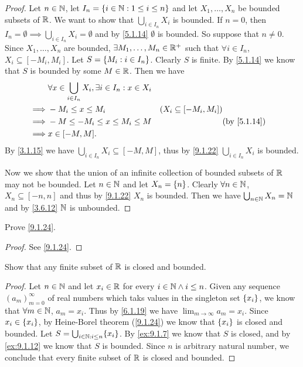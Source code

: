 \begin{proof}
	Let \(n \in \mathbb{N}\), let \(I_n = \left\lbrace i \in \mathbb{N} : 1 \leq i \leq n\right\rbrace\) and let \(X_1, \dots, X_n\) be bounded subsets of \(\mathbb{R}\).
	We want to show that \(\bigcup_{i \in I_n} X_i\) is bounded.
	If \(n = 0\), then \(I_n = \emptyset \implies \bigcup_{i \in I_n} X_i = \emptyset\) and by \cref{5.1.14} \(\emptyset\) is bounded.
	So suppose that \(n \neq 0\).
	Since \(X_1, \dots, X_n\) are bounded, \(\exists M_1, \dots, M_n \in \mathbb{R}^+\) such that \(\forall i \in I_n\), \(X_i \subseteq [-M_i, M_i]\).
	Let \(S = \left\lbrace M_i : i \in I_n\right\rbrace\).
	Clearly \(S\) is finite.
	By \cref{5.1.14} we know that \(S\) is bounded by some \(M \in \mathbb{R}\).
	Then we have
	\begin{align*}
		         & \forall x \in \bigcup_{i \in I_n} X_i, \exists i \in I_n : x \in X_i                                             \\
		\implies & -M_i \leq x \leq M_i                                                 & (X_i \subseteq [-M_i, M_i])               \\
		\implies & -M \leq -M_i \leq x \leq M_i \leq M                                  &                             & \by{5.1.14} \\
		\implies & x \in [-M, M].
	\end{align*}
	By \cref{3.1.15} we have \(\bigcup_{i \in I_n} X_i \subseteq [-M, M]\), thus by \cref{9.1.22} \(\bigcup_{i \in I_n} X_i\) is bounded.

	Now we show that the union of an infinite collection of bounded subsets of \(\mathbb{R}\) may not be bounded.
	Let \(n \in \mathbb{N}\) and let \(X_n = \left\lbrace n\right\rbrace\).
	Clearly \(\forall n \in \mathbb{N}\), \(X_n \subseteq [-n, n]\) and thus by \cref{9.1.22} \(X_n\) is bounded.
	Then we have \(\bigcup_{n \in \mathbb{N}} X_n = \mathbb{N}\) and by \cref{3.6.12} \(\mathbb{N}\) is unbounded.
\end{proof}

\begin{ex}\label{ex:9.1.13}
	Prove \cref{9.1.24}.
\end{ex}

\begin{proof}
	See \cref{9.1.24}.
\end{proof}

\begin{ex}\label{ex:9.1.14}
	Show that any finite subset of \(\mathbb{R}\) is closed and bounded.
\end{ex}

\begin{proof}
	Let \(n \in \mathbb{N}\) and let \(x_i \in \mathbb{R}\) for every \(i \in \mathbb{N} \land i \leq n\).
	Given any sequence \((a_m)_{m = 0}^\infty\) of real numbers which taks values in the singleton set \(\left\lbrace x_i\right\rbrace\), we know that \(\forall m \in \mathbb{N}\), \(a_m = x_i\).
	Thus by \cref{6.1.19} we have \(\lim_{m \to \infty} a_m = x_i\).
	Since \(x_i \in \left\lbrace x_i\right\rbrace\), by Heine-Borel theorem (\cref{9.1.24}) we know that \(\left\lbrace x_i\right\rbrace\) is closed and bounded.
	Let \(S = \bigcup_{i \in \N : i \leq n} \set{x_i}\).
	By \cref{ex:9.1.7} we know that \(S\) is closed, and by \cref{ex:9.1.12} we know that \(S\) is bounded.
	Since \(n\) is arbitrary natural number, we conclude that every finite subset of \(\mathbb{R}\) is closed and bounded.
\end{proof}


